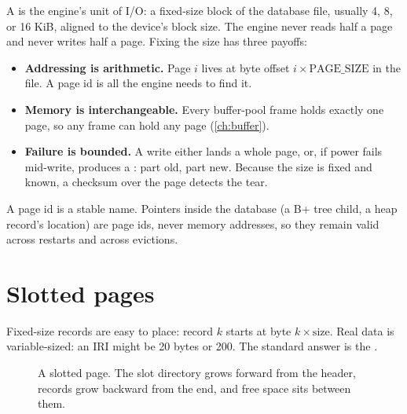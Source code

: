 A  is the engine's unit of I/O: a fixed-size block of the database
file, usually 4, 8, or 16 KiB, aligned to the device's block size. The engine
never reads half a page and never writes half a page. Fixing the size has three
payoffs:

\begin{itemize}
\item \textbf{Addressing is arithmetic.} Page $i$ lives at byte offset $i \times \text{PAGE\_SIZE}$ in the file. A page id is all the engine needs to find it.
\item \textbf{Memory is interchangeable.} Every buffer-pool frame holds exactly one page, so any frame can hold any page (\cref{ch:buffer}).
\item \textbf{Failure is bounded.} A write either lands a whole page, or, if power fails mid-write, produces a : part old, part new. Because the size is fixed and known, a checksum over the page detects the tear.
\end{itemize}

\begin{keyidea}
A page id is a stable name. Pointers inside the database (a B+ tree child, a
heap record's location) are page ids, never memory addresses, so they remain
valid across restarts and across evictions.
\end{keyidea}

\section{Slotted pages}

Fixed-size records are easy to place: record $k$ starts at byte $k \times
\text{size}$. Real data is variable-sized: an IRI might be 20 bytes or 200.
The standard answer is the .

\begin{figure}[ht]
\centering
{}
\caption{A slotted page. The slot directory grows forward from the header, records grow backward from the end, and free space sits between them.}
\label{fig:slotted}
\end{figure}

